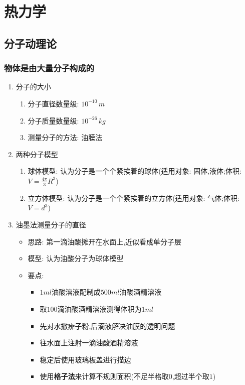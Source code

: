 \documentclass{article}
\begin{document}
\vspace{2em}

\section{热力学}
\subsection{分子动理论}
\subsubsection{物体是由大量分子构成的}
\begin{enumerate}
    \item 分子的大小
          \begin{enumerate}[label = (\arabic*{})]
              \item 分子直径数量级: $10^{-10} \, m$
              \item 分子质量数量级: $10^{-26} \, kg$
              \item 测量分子的方法: 油膜法
          \end{enumerate}

          \vspace{2em}

    \item 两种分子模型
          \begin{enumerate}[label = (\arabic*{})]
              \item 球体模型: 认为分子是一个个紧挨着的球体(适用对象: 固体,液体;体积:$V = \frac{4\pi}{3} R^{3}$)
              \item 立方体模型: 认为分子是一个个紧挨着的立方体(适用对象: 气体;体积:$V = d^{3}$)
          \end{enumerate}

          \vspace{2em}

    \item 油墨法测量分子的直径
          \begin{itemize}
              \item 思路: 第一滴油酸摊开在水面上,近似看成单分子层
              \item 模型: 认为油酸分子为球体模型
              \item 要点:
                    \begin{itemize}
                        \item $1ml$油酸溶液配制成$500ml$油酸酒精溶液
                        \item 取$100$滴油酸酒精溶液测得体积为$1ml$
                        \item 先对水撒痱子粉,后滴液解决油膜的透明问题
                        \item 往水面上注射一滴油酸酒精溶液
                        \item 稳定后使用玻璃板盖进行描边
                        \item 使用\textbf{格子法}来计算不规则面积(不足半格取$0$,超过半个取$1$)
                    \end{itemize}
          \end{itemize}


\end{enumerate}
\end{document}

